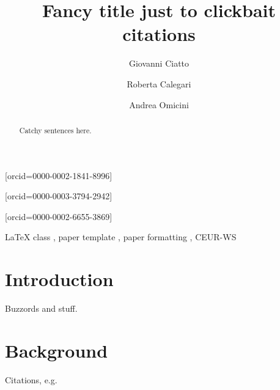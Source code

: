 \documentclass{ceurart}
\begin{document}
	


\title{Fancy title just to clickbait citations}
\tnotemark[1]

\author[1]{Giovanni Ciatto}[orcid=0000-0002-1841-8996]
\cormark[1]
\fnmark[1]
\author[2]{Roberta Calegari}[orcid=0000-0003-3794-2942]
\fnmark[1]
\author[1]{Andrea Omicini}[orcid=0000-0002-6655-3869]
\fnmark[1]

\address[1]{Dipartimento di Informatica -- Scienza e Ingegneria (DISI), \textsc{Alma Mater Studiorum}---Università di Bologna, Italy}
\address[2]{Alma Mater Research Institute for Human-Centered Artificial Intelligence, \textsc{Alma Mater Studiorum}---Università di Bologna, Italy}


\begin{abstract}
    Catchy sentences here.
\end{abstract}

\begin{keywords}
    LaTeX class 
    \sep
    paper template 
    \sep
    paper formatting 
    \sep
    CEUR-WS
\end{keywords}

\maketitle

\section{Introduction}

Buzzords and stuff. 

\section{Background}

Citations, e.g. \cite{MR781536}
\end{document}
